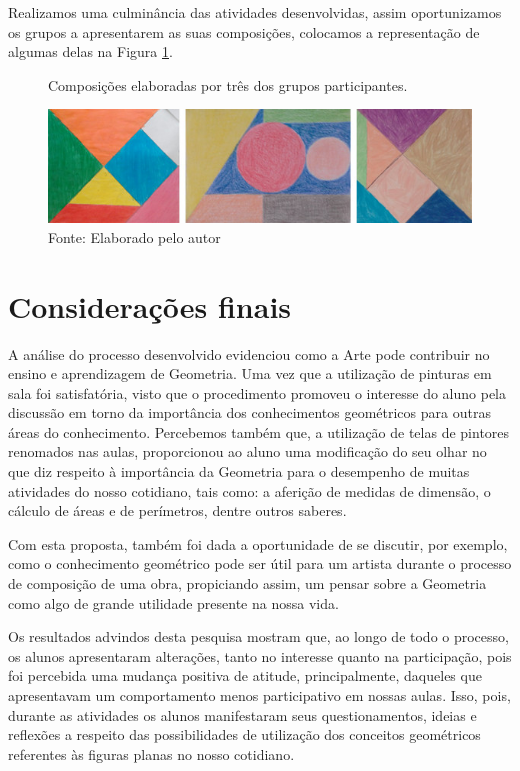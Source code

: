 \begin{refsection}
    Realizamos uma culminância das atividades desenvolvidas, assim oportunizamos os grupos a apresentarem as suas composições, colocamos a representação de algumas delas na Figura \ref{fig:composicoes-3-grupos}. 

    \begin{figure}[ht]%
        \centering%
        \caption{Composições elaboradas por três dos grupos participantes.}%
        \includegraphics[width=.90\textwidth]{articles/04-matematica-na-arte--/figura10.jpg}%
        \caption*{Fonte: Elaborado pelo autor}%
        \label{fig:composicoes-3-grupos}%
    \end{figure}%

    \section{Considerações finais}

    A análise do processo desenvolvido evidenciou como a Arte pode contribuir no ensino e aprendizagem de Geometria. Uma vez que a utilização de pinturas em sala foi satisfatória, visto que o procedimento promoveu o interesse do aluno pela discussão em torno da importância dos conhecimentos geométricos para outras áreas do conhecimento. Percebemos também que, a utilização de telas de pintores renomados nas aulas, proporcionou ao aluno uma modificação do seu olhar no que diz respeito à importância da Geometria para o desempenho de muitas atividades do nosso cotidiano, tais como: a aferição de medidas de dimensão, o cálculo de áreas e de perímetros, dentre outros saberes.  

    Com esta proposta, também foi dada a oportunidade de se discutir, por exemplo, como o conhecimento geométrico pode ser útil para um artista durante o processo de composição de uma obra, propiciando assim, um pensar sobre a Geometria como algo de grande utilidade presente na nossa vida. 

    Os resultados advindos desta pesquisa mostram que, ao longo de todo o processo, os alunos apresentaram alterações, tanto no interesse quanto na participação, pois foi percebida uma mudança positiva de atitude, principalmente, daqueles que apresentavam um comportamento menos participativo em nossas aulas. Isso, pois, durante as atividades os alunos manifestaram seus questionamentos, ideias e reflexões a respeito das possibilidades de utilização dos conceitos geométricos referentes às figuras planas no nosso cotidiano.   


\end{refsection}
